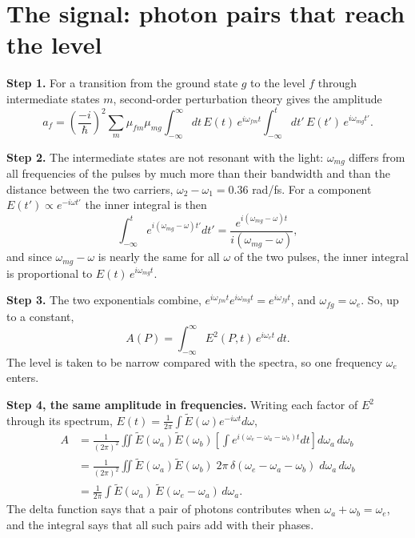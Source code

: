 \documentclass[11pt]{article}
\begin{document}
\section{The signal: photon pairs that reach the level}
\textbf{Step 1.} For a transition from the ground state $g$ to the level $f$ through intermediate states $m$,
second-order perturbation theory gives the amplitude
\begin{equation}a_f = \left(\frac{-i}{\hbar}\right)^2\sum_m\mu_{fm}\mu_{mg}
\int_{-\infty}^{\infty}dt\,E(t)\,e^{i\omega_{fm}t}\int_{-\infty}^{t}dt'\,E(t')\,e^{i\omega_{mg}t'} .\end{equation}

\textbf{Step 2.} The intermediate states are not resonant with the light: $\omega_{mg}$ differs from all frequencies
of the pulses by much more than their bandwidth and than the distance between the two carriers,
$\omega_2 - \omega_1 = 0.36$ rad/fs. For a component $E(t') \propto e^{-i\omega t'}$ the inner integral
is then
\begin{equation}\int_{-\infty}^{t}e^{i(\omega_{mg}-\omega)t'}dt' = \frac{e^{i(\omega_{mg}-\omega)t}}{i(\omega_{mg}-\omega)} ,\end{equation}
and since $\omega_{mg} - \omega$ is nearly the same for all $\omega$ of the two pulses, the inner integral is
proportional to $E(t)\,e^{i\omega_{mg}t}$.

\textbf{Step 3.} The two exponentials combine, $e^{i\omega_{fm}t}e^{i\omega_{mg}t} = e^{i\omega_{fg}t}$, and
$\omega_{fg} = \omega_e$. So, up to a constant,
\begin{equation}A(P) = \int_{-\infty}^{\infty}E^2(P,t)\,e^{i\omega_et}\,dt .\end{equation}
The level is taken to be narrow compared with the spectra, so one frequency $\omega_e$ enters.

\textbf{Step 4, the same amplitude in frequencies.} Writing each factor of $E^2$ through its spectrum,
$E(t) = \frac{1}{2\pi}\int\tilde E(\omega)e^{-i\omega t}d\omega$,
\begin{align}A &= \frac{1}{(2\pi)^2}\iint\tilde E(\omega_a)\tilde E(\omega_b)
\left[\int e^{i(\omega_e-\omega_a-\omega_b)t}dt\right]d\omega_a\,d\omega_b\\
&= \frac{1}{(2\pi)^2}\iint\tilde E(\omega_a)\tilde E(\omega_b)\;2\pi\,\delta(\omega_e-\omega_a-\omega_b)\;d\omega_a\,d\omega_b\\
&= \frac{1}{2\pi}\int\tilde E(\omega_a)\,\tilde E(\omega_e-\omega_a)\,d\omega_a .\label{eq:pairs}\end{align}
The delta function says that a pair of photons contributes when $\omega_a + \omega_b = \omega_e$, and the integral
says that all such pairs add with their phases.
\end{document}
